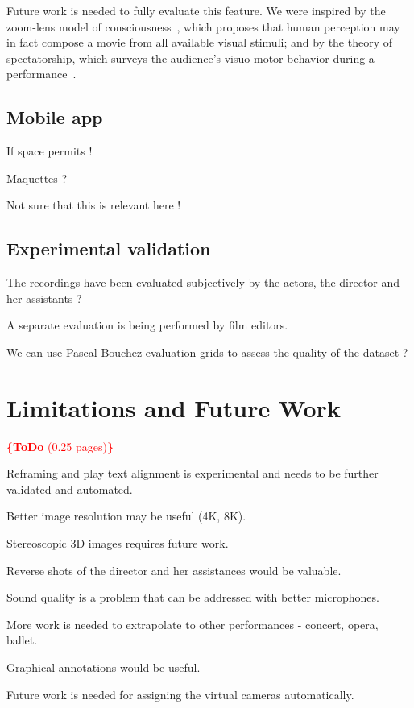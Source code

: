 \documentclass[conference]{IEEEtran}
\newcommand{\todo}[1]{\noindent\textcolor{red}{{\bf \{ToDo} #1{\bf \}}}}
\begin{document}
Future work is needed to fully evaluate this feature. We were inspired by the zoom-lens model of consciousness~\cite{Eriksen86}, 
which proposes  that human perception  may in fact compose a movie from all available visual  stimuli; and by the theory 
of spectatorship, which surveys the audience's visuo-motor behavior  during a performance~\cite{Bennett97}.   





\subsection{Mobile app} If space permits !

Maquettes ?

Not sure that this is relevant here !


\subsection{Experimental validation}
The recordings have been evaluated subjectively by the actors, the director and her assistants ?

A separate evaluation is being performed by film editors.

We can use Pascal Bouchez evaluation grids to assess the quality of the dataset ?


\section{Limitations and Future  Work}
\todo{(0.25 pages)}

Reframing and play text alignment is experimental and needs to be further validated and automated.

Better image resolution may be useful (4K, 8K).

Stereoscopic 3D images requires future work.

Reverse shots of the director and her assistances would be valuable.

Sound quality is a problem that can be addressed with better microphones.

More work is needed to extrapolate to other performances - concert, opera, ballet.

Graphical annotations would be useful.

Future work is needed for assigning the virtual cameras automatically.
\end{document}
